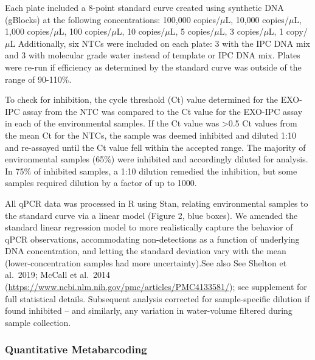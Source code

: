 \documentclass[
]{article}
\begin{document}
Each plate included a 8-point standard curve created using synthetic DNA
(gBlocks) at the following concentrations: 100,000 copies/\(\mu\)L,
10,000 copies/\(\mu\)L, 1,000 copies/\(\mu\)L, 100 copies/\(\mu\)L, 10
copies/\(\mu\)L, 5 copies/\(\mu\)L, 3 copies/\(\mu\)L, 1 copy/\(\mu\)L
Additionally, six NTCs were included on each plate: 3 with the IPC DNA
mix and 3 with molecular grade water instead of template or IPC DNA mix.
Plates were re-run if efficiency as determined by the standard curve was
outside of the range of 90-110\%.

To check for inhibition, the cycle threshold (Ct) value determined for
the EXO-IPC assay from the NTC was compared to the Ct value for the
EXO-IPC assay in each of the environmental samples. If the Ct value was
\textgreater0.5 Ct values from the mean Ct for the NTCs, the sample was
deemed inhibited and diluted 1:10 and re-assayed until the Ct value fell
within the accepted range. The majority of environmental samples (65\%)
were inhibited and accordingly diluted for analysis. In 75\% of
inhibited samples, a 1:10 dilution remedied the inhibition, but some
samples required dilution by a factor of up to 1000.

All qPCR data was processed in R using Stan, relating environmental
samples to the standard curve via a linear model (Figure 2, blue boxes).
We amended the standard linear regression model to more realistically
capture the behavior of qPCR observations, accommodating non-detections
as a function of underlying DNA concentration, and letting the standard
deviation vary with the mean (lower-concentration samples had more
uncertainty).See also See Shelton et al.~2019; McCall et al.~2014
(\url{https://www.ncbi.nlm.nih.gov/pmc/articles/PMC4133581/}); see
supplement for full statistical details. Subsequent analysis corrected
for sample-specific dilution if found inhibited -- and similarly, any
variation in water-volume filtered during sample collection.

\hypertarget{quantitative-metabarcoding}{%
\subsubsection{Quantitative
Metabarcoding}\label{quantitative-metabarcoding}}
\end{document}
